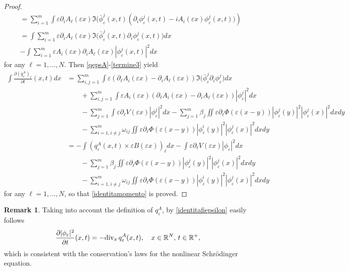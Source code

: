 \documentclass[11pt]{amsart}
\numberwithin{equation}{section}
\theoremstyle{definition}
\newtheorem{remark}[theorem]{Remark}
\begin{document}
\begin{proof}
\begin{equation}
\begin{aligned}
& =  \sum_{i=1}^{m}\int {\varepsilon}\partial_i A_\ell({\varepsilon} x)
{{\Im}}(\bar\phi_{\varepsilon}^j(x, t)\left(\partial_i
\phi_{\varepsilon}^j(x,t)-iA_i({\varepsilon} x)\phi_{\varepsilon}^j(x,t))\right)\\
& = \int \sum_{i=1}^m {\varepsilon}\partial_i A_\ell({\varepsilon} x)
{{\Im}}\big(\bar\phi_{\varepsilon}^j(x,t)\partial_i\phi_{\varepsilon}^j(x,t)\big)dx \\
&  -\int \sum_{i=1}^m {\varepsilon} A_i({\varepsilon} x)\partial_i A_\ell({\varepsilon}
x)|\phi_{\varepsilon}^j(x,t)|^2dx
\end{aligned}
\end{equation}
for any $\ell=1, \dots, N$.
Then \eqref{qepsA}-\eqref{termine3} yield
$$\begin{aligned}
\int \frac{\partial (q_{\varepsilon}^A)_\ell}{\partial t}(x,t) dx & =
\sum_{i,j=1}^m \int {\varepsilon}\left(\partial_\ell A_i({\varepsilon} x)-\partial_i
A_\ell({\varepsilon} x)\right){{\Im}}\big(\bar\phi_{\varepsilon}^j\partial_i\phi_{\varepsilon}^j\big)dx\\
& \qquad + \sum_{i,j=1}^m\int {\varepsilon} A_i({\varepsilon} x)\left(\partial_\ell
A_i({\varepsilon} x)-\partial_i A_\ell({\varepsilon} x)\right)
|\phi_{\varepsilon}^j|^2dx\\
& \qquad - \sum_{j=1}^m\int {\varepsilon}\partial_\ell V({\varepsilon}
x)|\phi_{\varepsilon}^j|^2dx- \sum_{j=1}^m\beta_j\iint
{\varepsilon}\partial_\ell\Phi({\varepsilon}(x-y))|\phi_{\varepsilon}^j(y)|^2|\phi_{\varepsilon}^j(x)|^2dxdy\\
& \qquad -\sum_{i=1, i\not =j}^m\omega_{ij}\iint
{\varepsilon}\partial_\ell\Phi({\varepsilon}(x-y))|\phi_{\varepsilon}^i(y)|^2|\phi_{\varepsilon}^j(x)|^2dxdy\\
& = -\int \left(q_{\varepsilon}^A(x,t)\times {\varepsilon} B({\varepsilon} x)\right)_\ell dx
-  \int {\varepsilon}\partial_\ell V({\varepsilon} x)|\phi_{\varepsilon}|^2dx\\
& \qquad - \sum_{j=1}^m\beta_j\iint
{\varepsilon}\partial_\ell\Phi({\varepsilon}(x-y))|\phi_{\varepsilon}^j(y)|^2|\phi_{\varepsilon}^j(x)|^2dxdy\\
& \qquad -\sum_{i=1, i\not =j}^m\omega_{ij}\iint
{\varepsilon}\partial_\ell\Phi({\varepsilon}(x-y))|\phi_{\varepsilon}^i(y)|^2|\phi_{\varepsilon}^j(x)|^2dxdy
\end{aligned}$$
for any $\ell=1, \dots, N$, so that \eqref{identitamomento} is proved.
\end{proof}

\begin{remark}
Taking into account the definition of $q_{\varepsilon}^A$, by
\eqref{identitafiepsilon} easily follows
$$\frac{\partial
|\phi_{\varepsilon}|^{2}}{\partial t}(x,t)=-{\rm div}_{x}\,
q_{\varepsilon}^A(x,t),\quad x\in{{\mathbb R}}^N,\, t\in{{\mathbb R}}^+,$$
which is consistent
with the conservation's laws for the nonlinear Schr\"odinger
equation.
\end{remark}
\end{document}
